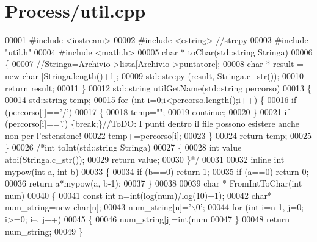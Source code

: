 \hypertarget{util_8cpp_source}{\section{\-Process/util.cpp}
}

\begin{DoxyCode}
00001 \textcolor{preprocessor}{#include <iostream>}
00002 \textcolor{preprocessor}{#include <cstring>} \textcolor{comment}{//strcpy}
00003 \textcolor{preprocessor}{#include "util.h"}
00004 \textcolor{preprocessor}{#include <math.h>}
00005 \textcolor{keywordtype}{char} * toChar(std::string Stringa)
00006 \{
00007     \textcolor{comment}{//Stringa=Archivio->lista[Archivio->puntatore];}
00008     \textcolor{keywordtype}{char} * result = \textcolor{keyword}{new} \textcolor{keywordtype}{char} [Stringa.length()+1];
00009     std::strcpy (result, Stringa.c\_str());
00010     \textcolor{keywordflow}{return} result;
00011 \}
00012 std::string utilGetName(std::string percorso)
00013 \{
00014     std::string temp;
00015     \textcolor{keywordflow}{for} (\textcolor{keywordtype}{int} i=0;i<percorso.length();i++) \{
00016         \textcolor{keywordflow}{if} (percorso[i]==\textcolor{charliteral}{'/'})
00017         \{
00018                 temp=\textcolor{stringliteral}{""};
00019                 \textcolor{keywordflow}{continue};
00020         \}
00021         \textcolor{keywordflow}{if} (percorso[i]==\textcolor{charliteral}{'.'}) \{\textcolor{keywordflow}{break};\}\textcolor{comment}{//ToDO: I punti dentro il file possono
       esistere anche non per l'estensione!}
00022         temp+=percorso[i];
00023     \}
00024     \textcolor{keywordflow}{return} temp;
00025 \}
00026 \textcolor{comment}{/*int toInt(std::string Stringa)}
00027 \textcolor{comment}{\{}
00028 \textcolor{comment}{    int value = atoi(Stringa.c\_str());}
00029 \textcolor{comment}{    return value;}
00030 \textcolor{comment}{\}*/}
00031 
00032 \textcolor{keyword}{inline} \textcolor{keywordtype}{int} mypow(\textcolor{keywordtype}{int} a, \textcolor{keywordtype}{int} b)
00033 \{
00034     \textcolor{keywordflow}{if} (b==0) \textcolor{keywordflow}{return} 1;
00035     \textcolor{keywordflow}{if} (a==0) \textcolor{keywordflow}{return} 0;
00036     \textcolor{keywordflow}{return} a*mypow(a, b-1);
00037 \}
00038 
00039 \textcolor{keywordtype}{char} * FromIntToChar(\textcolor{keywordtype}{int} num)
00040 \{
00041     \textcolor{keyword}{const} \textcolor{keywordtype}{int} n=int(log(num)/log(10)+1);
00042     \textcolor{keywordtype}{char}* num\_string=\textcolor{keyword}{new} \textcolor{keywordtype}{char}[n];
00043     num\_string[n]=\textcolor{charliteral}{'\(\backslash\)0'};
00044     \textcolor{keywordflow}{for} (\textcolor{keywordtype}{int} i=n-1, j=0; i>=0; i--, j++)
00045     \{
00046         num\_string[j]=int(num%
00047     \}
00048     \textcolor{keywordflow}{return} num\_string;
00049 \}
\end{DoxyCode}
